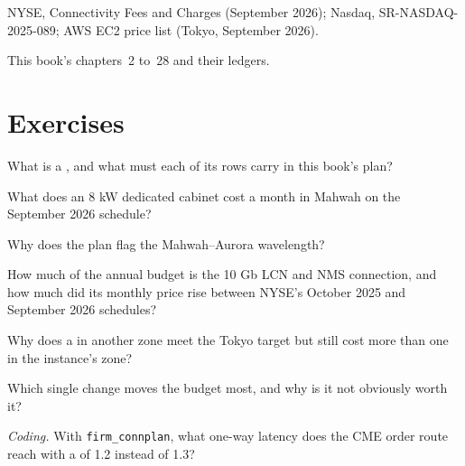 \begin{omsources}
\item NYSE, Connectivity Fees and Charges (September 2026); Nasdaq, SR-NASDAQ-2025-089; AWS EC2 price list (Tokyo, September 2026).
\item This book's chapters~2 to~28 and their ledgers.
\end{omsources}

\section{Exercises}

\begin{exercise}[$\star$]\label{exo:nw:build-a-connectivity-plan:1}
What is a , and what must each of its rows carry in this book's plan?
\end{exercise}

\begin{exercise}[$\star$]\label{exo:nw:build-a-connectivity-plan:2}
What does an 8 kW dedicated cabinet cost a month in Mahwah on the September 2026 schedule?
\end{exercise}

\begin{exercise}[$\star$]\label{exo:nw:build-a-connectivity-plan:3}
Why does the plan flag the Mahwah--Aurora wavelength?
\end{exercise}

\begin{exercise}[$\star\star$]\label{exo:nw:build-a-connectivity-plan:4}
How much of the annual budget is the 10 Gb LCN and NMS connection, and how much did its monthly price rise between NYSE's October 2025 and
September 2026 schedules?
\end{exercise}

\begin{exercise}[$\star\star$]\label{exo:nw:build-a-connectivity-plan:5}
Why does a  in another zone meet the Tokyo target but still cost more than one in the instance's zone?
\end{exercise}

\begin{exercise}[$\star\star$]\label{exo:nw:build-a-connectivity-plan:6}
Which single change moves the budget most, and why is it not obviously worth it?
\end{exercise}

\begin{exercise}[$\star\star\star$]\label{exo:nw:build-a-connectivity-plan:7}
\emph{Coding.} With \texttt{firm\_connplan}, what one-way latency does the CME order route reach with a  of 1.2 instead of 1.3?
\end{exercise}

